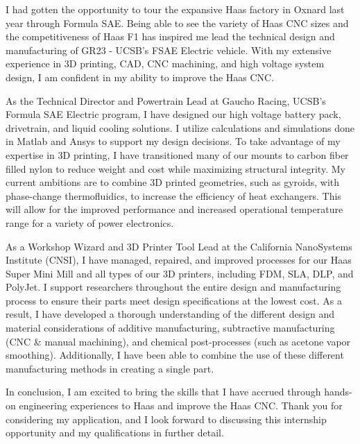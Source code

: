\documentclass[11pt, letterpaper]{awesome-cv} %
\begin{document}
\makecvheader %

\makelettertitle %


\begin{cvletter}


I had gotten the opportunity to tour the expansive Haas factory in Oxnard last year through Formula SAE. Being able to see the variety of Haas CNC sizes and the competitiveness of Haas F1 has inspired me lead the technical design and manufacturing of GR23 - UCSB's FSAE Electric vehicle. With my extensive experience in 3D printing, CAD, CNC machining, and high voltage system design, I am confident in my ability to improve the Haas CNC.

As the Technical Director and Powertrain Lead at Gaucho Racing, UCSB's Formula SAE Electric program, I have designed our high voltage battery pack, drivetrain, and liquid cooling solutions. I utilize calculations and simulations done in Matlab and Ansys to support my design decisions. To take advantage of my expertise in 3D printing, I have transitioned many of our mounts to carbon fiber filled nylon to reduce weight and cost while maximizing structural integrity. My current ambitions are to combine 3D printed geometries, such as gyroids, with phase-change thermofluidics, to increase the efficiency of heat exchangers. This will allow for the improved performance and increased operational temperature range for a variety of power electronics.

As a Workshop Wizard and 3D Printer Tool Lead at the California NanoSystems Institute (CNSI), I have managed, repaired, and improved processes for our Haas Super Mini Mill and all types of our 3D printers, including FDM, SLA, DLP, and PolyJet. I support researchers throughout the entire design and manufacturing process to ensure their parts meet design specifications at the lowest cost. As a result, I have developed a thorough understanding of the different design and material considerations of additive manufacturing, subtractive manufacturing (CNC \& manual machining), and chemical post-processes (such as acetone vapor smoothing). Additionally, I have been able to combine the use of these different manufacturing methods in creating a single part.

In conclusion, I am excited to bring the skills that I have accrued through hands-on engineering experiences to Haas and improve the Haas CNC. Thank you for considering my application, and I look forward to discussing this internship opportunity and my qualifications in further detail.


\end{cvletter}


\makeletterclosing %
\end{document}
